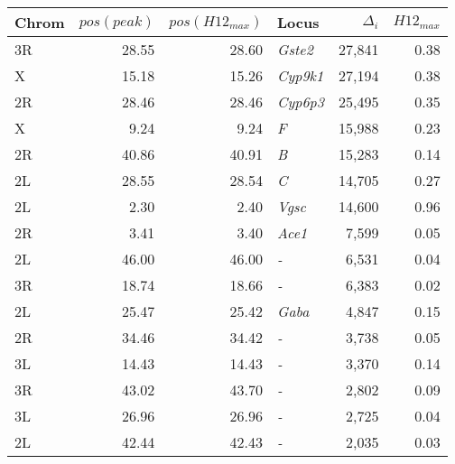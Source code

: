 \begin{tabular}{lrrlrr}
\toprule
Chrom & $pos(peak)$ & $pos(H12_{max})$ &            Locus & $\Delta_{i}$ & $H12_{max}$ \\
\midrule
   3R &       28.55 &            28.60 &   \textit{Gste2} &       27,841 &        0.38 \\
    X &       15.18 &            15.26 &  \textit{Cyp9k1} &       27,194 &        0.38 \\
   2R &       28.46 &            28.46 &  \textit{Cyp6p3} &       25,495 &        0.35 \\
    X &        9.24 &             9.24 &       \textit{F} &       15,988 &        0.23 \\
   2R &       40.86 &            40.91 &       \textit{B} &       15,283 &        0.14 \\
   2L &       28.55 &            28.54 &       \textit{C} &       14,705 &        0.27 \\
   2L &        2.30 &             2.40 &    \textit{Vgsc} &       14,600 &        0.96 \\
   2R &        3.41 &             3.40 &    \textit{Ace1} &        7,599 &        0.05 \\
   2L &       46.00 &            46.00 &       \textit{-} &        6,531 &        0.04 \\
   3R &       18.74 &            18.66 &       \textit{-} &        6,383 &        0.02 \\
   2L &       25.47 &            25.42 &    \textit{Gaba} &        4,847 &        0.15 \\
   2R &       34.46 &            34.42 &       \textit{-} &        3,738 &        0.05 \\
   3L &       14.43 &            14.43 &       \textit{-} &        3,370 &        0.14 \\
   3R &       43.02 &            43.70 &       \textit{-} &        2,802 &        0.09 \\
   3L &       26.96 &            26.96 &       \textit{-} &        2,725 &        0.04 \\
   2L &       42.44 &            42.43 &       \textit{-} &        2,035 &        0.03 \\
\bottomrule
\end{tabular}
